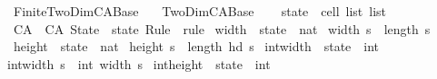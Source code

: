 %
\begin{isabellebody}%
%
%
\isadelimdocument
%
\endisadelimdocument
%
\isatagdocument
%
\isamarkuptrue%
%
\endisatagdocument
{\isafolddocument}%
%
\isadelimdocument
%
\endisadelimdocument
%
\isadelimtheory
%
\endisadelimtheory
%
\isatagtheory
{}\isamarkupfalse%
\ Finite{\isacharunderscore}TwoDim{\isacharunderscore}CA{\isacharunderscore}Base\isanewline
\ \ \ TwoDim{\isacharunderscore}CA{\isacharunderscore}Base\isanewline
{}%
\endisatagtheory
{\isafoldtheory}%
%
\isadelimtheory
\isanewline
%
\endisadelimtheory
\ \ \isanewline
\isanewline
{}\isamarkupfalse%
\ state\ {\isacharequal}\ {\isachardoublequoteopen}cell\ list\ list{\isachardoublequoteclose}\isanewline
\isanewline
{}\isamarkupfalse%
\ CA\ {\isacharequal}\ CA\ {\isacharparenleft}State\ {\isacharcolon}\ state{\isacharparenright}\ {\isacharparenleft}Rule\ {\isacharcolon}\ rule{\isacharparenright}%
\isadelimdocument
%
\endisadelimdocument
%
\isatagdocument
%
\isamarkuptrue%
%
\endisatagdocument
{\isafolddocument}%
%
\isadelimdocument
%
\endisadelimdocument
{}\isamarkupfalse%
\ width\ {\isacharcolon}{\isacharcolon}\ {\isachardoublequoteopen}state\ {\isasymRightarrow}\ nat{\isachardoublequoteclose}\ \isanewline
{\isachardoublequoteopen}width\ s\ {\isasymequiv}\ length\ s{\isachardoublequoteclose}\isanewline
\isanewline
{}\isamarkupfalse%
\ height\ {\isacharcolon}{\isacharcolon}\ {\isachardoublequoteopen}state\ {\isasymRightarrow}\ nat{\isachardoublequoteclose}\ \isanewline
{\isachardoublequoteopen}height\ s\ {\isacharequal}\ length\ {\isacharparenleft}hd\ s{\isacharparenright}{\isachardoublequoteclose}\isanewline
\isanewline
{}\isamarkupfalse%
\ int{\isacharunderscore}width\ {\isacharcolon}{\isacharcolon}\ {\isachardoublequoteopen}state\ {\isasymRightarrow}\ int{\isachardoublequoteclose}\ \isanewline
{\isachardoublequoteopen}int{\isacharunderscore}width\ s\ {\isasymequiv}\ int\ {\isacharparenleft}width\ s{\isacharparenright}{\isachardoublequoteclose}\isanewline
\isanewline
{}\isamarkupfalse%
\ int{\isacharunderscore}height\ {\isacharcolon}{\isacharcolon}\ {\isachardoublequoteopen}state\ {\isasymRightarrow}\ int{\isachardoublequoteclose}\ \isanewline

\end{isabellebody}
